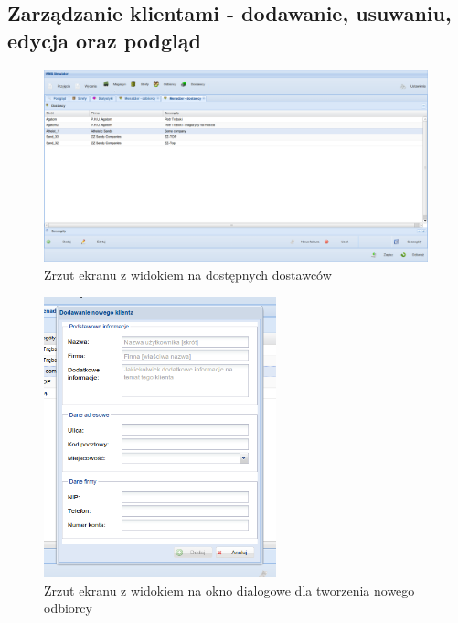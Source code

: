 	\subsection{Zarządzanie klientami - dodawanie, usuwaniu, edycja oraz podgląd}
		\begin{figure}[h]
			\centering
			\includegraphics[width=0.99\textwidth]{images/app/supplier_preview}
			\caption[Aplikacja - Dostęp do danych klientów]{Zrzut ekranu z widokiem na dostępnych dostawców}
			\label{c7:fig:app:supplier_preview}
		\end{figure}
		\begin{figure}[h]
			\centering
			\includegraphics[width=0.6\textwidth]{images/app/new_receipient_dialog}
			\caption[Aplikacja - Dodawania nowego klienta - odbiorcy]{Zrzut ekranu z widokiem na okno dialogowe dla tworzenia nowego odbiorcy}
			\label{c7:fig:app:new_receipient_dialog}
		\end{figure}
		
